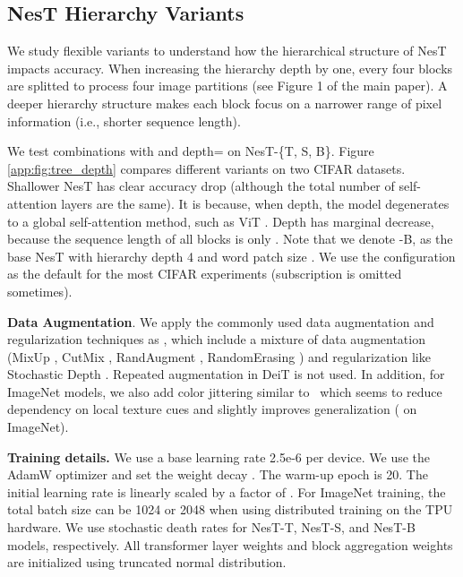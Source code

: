 \documentclass{article}
\newcommand{\topic}[1]{\noindent \textbf{#1}}
\newcommand{\OURS}{NesT\xspace}
\begin{document}
\subsection{\OURS Hierarchy Variants}
We study flexible variants to understand how the hierarchical structure of \OURS impacts accuracy.
When increasing the hierarchy depth by one, every four blocks are splitted to process four image partitions (see Figure 1 of the main paper).
A deeper hierarchy structure makes each block focus on a narrower range of pixel information (i.e., shorter sequence length). 

We test combinations with  and depth= on \OURS-\{T, S, B\}. 
Figure \ref{app:fig:tree_depth} compares different variants on two CIFAR datasets. Shallower \OURS has clear accuracy drop (although the total number of self-attention layers are the same). It is because, when depth, the model degenerates to a global self-attention method, such as ViT \cite{dosovitskiy2020image}. Depth has marginal decrease, because the sequence length of all blocks is only . 
Note that we denote -B,  as the base \OURS with hierarchy depth 4 and word patch size . We use the configuration  as the default for the most CIFAR experiments (subscription is omitted sometimes).

\topic{Data Augmentation}. We apply the commonly used data augmentation and regularization techniques as \cite{touvron2020training}, which include a mixture of data augmentation (MixUp \cite{zhang2017mixup}, CutMix \cite{yun2019cutmix}, RandAugment \cite{cubuk2020randaugment}, RandomErasing \cite{zhong2020random}) and regularization like Stochastic Depth \cite{huang2016deep}. Repeated augmentation \cite{hoffer2020augment} in DeiT is not used.
In addition, for ImageNet models, we also add color jittering similar to~\cite{chen2020simple,chen2020big} which seems to reduce dependency on local texture cues and slightly improves generalization ( on ImageNet).

\topic{Training details.} 
We use a base learning rate 2.5e-6 per device. We use the AdamW optimizer \cite{loshchilov2018fixing} and set the weight decay . The warm-up epoch is 20. 
The initial learning rate is linearly scaled by a factor of . 
For ImageNet training, the total batch size can be 1024 or 2048 when using distributed training on the TPU hardware. 
We use  stochastic death rates for \OURS-T, \OURS-S, and \OURS-B models, respectively. All transformer layer weights and block aggregation weights are initialized using truncated normal distribution.
\end{document}
